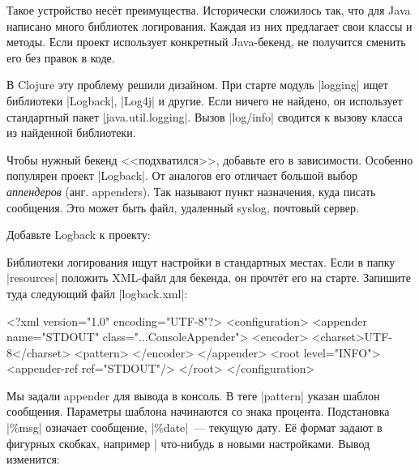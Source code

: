 Такое устройство нес\"{е}т преимущества. Исторически сложилось так, что для Java
написано много библиотек логирования. Каждая из них предлагает свои классы и
методы. Если проект использует конкретный Java-бекенд, не получится сменить его
без правок в коде.


В Clojure эту проблему решили дизайном. При старте модуль \spverb|logging| ищет
библиотеки \spverb|Logback|, \spverb|Log4j| и другие. Если ничего не найдено, он
использует стандартный пакет \spverb|java.util.logging|. Вызов \spverb|log/info|
сводится к вызову класса из найденной библиотеки.

Чтобы нужный бекенд <<подхватился>>, добавьте его в зависимости. Особенно
популярен проект \spverb|Logback|. От аналогов его отличает большой выбор
\emph{аппендеров} (анг. appenders). Так называют пункт назначения, куда писать
сообщения. Это может быть файл, удаленный syslog, почтовый сервер.

Добавьте Logback к проекту:

\begin{english}
  \begin{clojure}
  \end{clojure}
\end{english}


Библиотеки логирования ищут настройки в стандартных местах. Если в папку
\spverb|resources| положить XML-файл для бекенда, он прочт\"{е}т его на
старте. Запишите туда следующий файл \spverb|logback.xml|:

\begin{english}
  \begin{xml}
<?xml version="1.0" encoding="UTF-8"?>
<configuration>
  <appender name="STDOUT" class="...ConsoleAppender">
    <encoder>
      <charset>UTF-8</charset>
      <pattern>%
    </encoder>
  </appender>
  <root level="INFO">
    <appender-ref ref="STDOUT"/>
  </root>
</configuration>
  \end{xml}
\end{english}


Мы задали appender для вывода в консоль. В теге \spverb|pattern| указан шаблон
сообщения. Параметры шаблона начинаются со знака процента. Подстановка
\spverb|\%msg| означает сообщение, \spverb|\%date|~--- текущую дату. Е\"{е}
формат задают в фигурных скобках, например \spverb|%
что-нибудь в новыми настройками. Вывод изменится:

